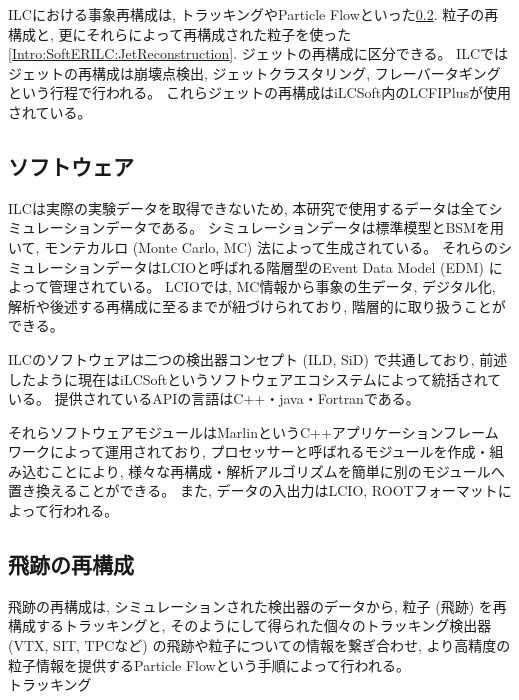 ILCにおける事象再構成は, トラッキングやParticle Flowといった\ref{Intro:SoftERILC:ParticleReconstruction}. 粒子の再構成と, 更にそれらによって再構成された粒子を使った\ref{Intro:SoftERILC:JetReconstruction}. ジェットの再構成に区分できる。
ILCではジェットの再構成は崩壊点検出, ジェットクラスタリング, フレーバータギングという行程で行われる。
これらジェットの再構成はiLCSoft内のLCFIPlus\cite{LCFIPlus}が使用されている。


\subsection{ソフトウェア} \label{Intro:SoftERILC:Software}

ILCは実際の実験データを取得できないため, 本研究で使用するデータは全てシミュレーションデータである。
シミュレーションデータは標準模型とBSMを用いて, モンテカルロ (Monte Carlo, MC) 法によって生成されている。
それらのシミュレーションデータはLCIOと呼ばれる階層型のEvent Data Model (EDM) によって管理されている。
LCIOでは, MC情報から事象の生データ, デジタル化, 解析や後述する再構成に至るまでが紐づけられており, 階層的に取り扱うことができる。

ILCのソフトウェアは二つの検出器コンセプト (ILD, SiD) で共通しており, 前述したように現在はiLCSoftというソフトウェアエコシステムによって統括されている。
提供されているAPIの言語はC++・java・Fortranである。

それらソフトウェアモジュールはMarlin\cite{Marlinpaper}というC++アプリケーションフレームワークによって運用されており, プロセッサーと呼ばれるモジュールを作成・組み込むことにより, 様々な再構成・解析アルゴリズムを簡単に別のモジュールへ置き換えることができる。
また, データの入出力はLCIO, ROOTフォーマットによって行われる。


\subsection{飛跡の再構成} \label{Intro:SoftERILC:ParticleReconstruction}

飛跡の再構成は, シミュレーションされた検出器のデータから, 粒子 (飛跡) を再構成するトラッキングと, そのようにして得られた個々のトラッキング検出器 (VTX, SIT, TPCなど) の飛跡や粒子についての情報を繋ぎ合わせ, より高精度の粒子情報を提供するParticle Flowという手順によって行われる。\\

トラッキング\\

